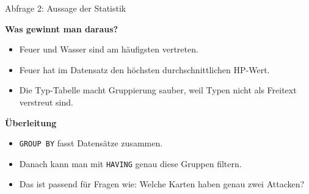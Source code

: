 \documentclass[aspectratio=169,11pt]{beamer}
\begin{document}
\begin{frame}{Abfrage 2: Aussage der Statistik}
  \begin{minipage}[t]{0.48\textwidth}
    \begin{panel}[colback=softgreen,colframe=green!40,height=5.4cm]
      {\bfseries Was gewinnt man daraus?}\par
      \begin{itemize}
        \item Feuer und Wasser sind am h\"aufigsten vertreten.
        \item Feuer hat im Datensatz den h\"ochsten durchschnittlichen HP-Wert.
        \item Die Typ-Tabelle macht Gruppierung sauber, weil Typen nicht als Freitext verstreut sind.
      \end{itemize}
    \end{panel}
  \end{minipage}\hfill
  \begin{minipage}[t]{0.48\textwidth}
    \begin{panel}[colback=softblue,colframe=blue!35,height=5.4cm]
      {\bfseries \"Uberleitung}\par
      \begin{itemize}
        \item \texttt{GROUP BY} fasst Datens\"atze zusammen.
        \item Danach kann man mit \texttt{HAVING} genau diese Gruppen filtern.
        \item Das ist passend f\"ur Fragen wie: Welche Karten haben genau zwei Attacken?
      \end{itemize}
    \end{panel}
  \end{minipage}
\end{frame}
\end{document}
